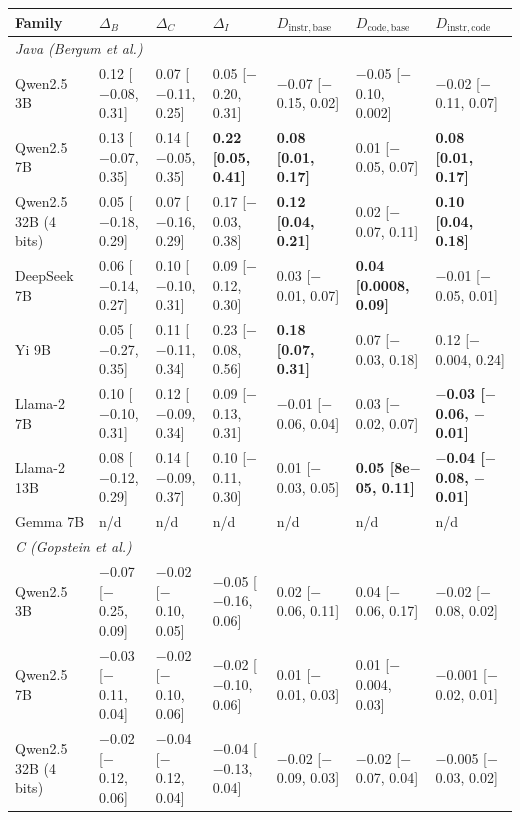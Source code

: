 \begin{tabular}{lllllll}
\toprule
Family & $\Delta_B$ & $\Delta_C$ & $\Delta_I$ & $D_{\mathrm{instr},\mathrm{base}}$ & $D_{\mathrm{code},\mathrm{base}}$ & $D_{\mathrm{instr},\mathrm{code}}$ \\
\midrule
\multicolumn{7}{l}{\textit{Java (Bergum et al.)}} \\
Qwen2.5 3B & 0.12 [$-$0.08, 0.31] & 0.07 [$-$0.11, 0.25] & 0.05 [$-$0.20, 0.31] & $-$0.07 [$-$0.15, 0.02] & $-$0.05 [$-$0.10, 0.002] & $-$0.02 [$-$0.11, 0.07] \\
Qwen2.5 7B & 0.13 [$-$0.07, 0.35] & 0.14 [$-$0.05, 0.35] & \textbf{0.22 [0.05, 0.41]} & \textbf{0.08 [0.01, 0.17]} & 0.01 [$-$0.05, 0.07] & \textbf{0.08 [0.01, 0.17]} \\
Qwen2.5 32B (4 bits) & 0.05 [$-$0.18, 0.29] & 0.07 [$-$0.16, 0.29] & 0.17 [$-$0.03, 0.38] & \textbf{0.12 [0.04, 0.21]} & 0.02 [$-$0.07, 0.11] & \textbf{0.10 [0.04, 0.18]} \\
DeepSeek 7B & 0.06 [$-$0.14, 0.27] & 0.10 [$-$0.10, 0.31] & 0.09 [$-$0.12, 0.30] & 0.03 [$-$0.01, 0.07] & \textbf{0.04 [0.0008, 0.09]} & $-$0.01 [$-$0.05, 0.01] \\
Yi 9B & 0.05 [$-$0.27, 0.35] & 0.11 [$-$0.11, 0.34] & 0.23 [$-$0.08, 0.56] & \textbf{0.18 [0.07, 0.31]} & 0.07 [$-$0.03, 0.18] & 0.12 [$-$0.004, 0.24] \\
Llama-2 7B & 0.10 [$-$0.10, 0.31] & 0.12 [$-$0.09, 0.34] & 0.09 [$-$0.13, 0.31] & $-$0.01 [$-$0.06, 0.04] & 0.03 [$-$0.02, 0.07] & \textbf{$-$0.03 [$-$0.06, $-$0.01]} \\
Llama-2 13B & 0.08 [$-$0.12, 0.29] & 0.14 [$-$0.09, 0.37] & 0.10 [$-$0.11, 0.30] & 0.01 [$-$0.03, 0.05] & \textbf{0.05 [8e$-$05, 0.11]} & \textbf{$-$0.04 [$-$0.08, $-$0.01]} \\
Gemma 7B & n/d & n/d & n/d & n/d & n/d & n/d \\
\multicolumn{7}{l}{\textit{C (Gopstein et al.)}} \\
Qwen2.5 3B & $-$0.07 [$-$0.25, 0.09] & $-$0.02 [$-$0.10, 0.05] & $-$0.05 [$-$0.16, 0.06] & 0.02 [$-$0.06, 0.11] & 0.04 [$-$0.06, 0.17] & $-$0.02 [$-$0.08, 0.02] \\
Qwen2.5 7B & $-$0.03 [$-$0.11, 0.04] & $-$0.02 [$-$0.10, 0.06] & $-$0.02 [$-$0.10, 0.06] & 0.01 [$-$0.01, 0.03] & 0.01 [$-$0.004, 0.03] & $-$0.001 [$-$0.02, 0.01] \\
Qwen2.5 32B (4 bits) & $-$0.02 [$-$0.12, 0.06] & $-$0.04 [$-$0.12, 0.04] & $-$0.04 [$-$0.13, 0.04] & $-$0.02 [$-$0.09, 0.03] & $-$0.02 [$-$0.07, 0.04] & $-$0.005 [$-$0.03, 0.02] \\

\end{tabular}
